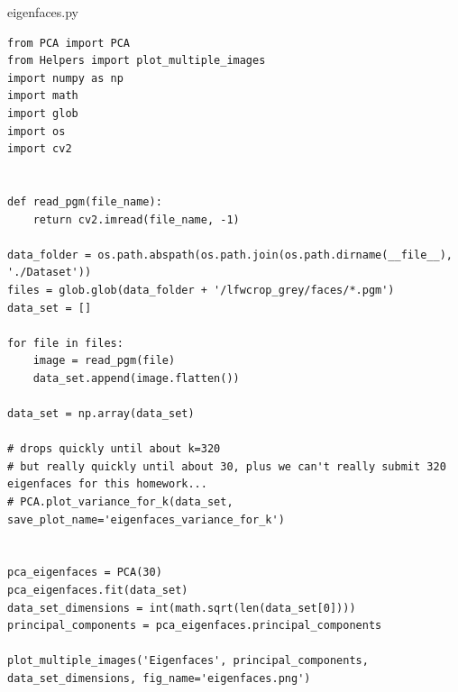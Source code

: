 eigenfaces.py
\begin{lstlisting}[style=py]
from PCA import PCA
from Helpers import plot_multiple_images
import numpy as np
import math
import glob
import os
import cv2


def read_pgm(file_name):
    return cv2.imread(file_name, -1)

data_folder = os.path.abspath(os.path.join(os.path.dirname(__file__), './Dataset'))
files = glob.glob(data_folder + '/lfwcrop_grey/faces/*.pgm')
data_set = []

for file in files:
    image = read_pgm(file)
    data_set.append(image.flatten())

data_set = np.array(data_set)

# drops quickly until about k=320
# but really quickly until about 30, plus we can't really submit 320 eigenfaces for this homework...
# PCA.plot_variance_for_k(data_set, save_plot_name='eigenfaces_variance_for_k')


pca_eigenfaces = PCA(30)
pca_eigenfaces.fit(data_set)
data_set_dimensions = int(math.sqrt(len(data_set[0])))
principal_components = pca_eigenfaces.principal_components

plot_multiple_images('Eigenfaces', principal_components, data_set_dimensions, fig_name='eigenfaces.png')

\end{lstlisting}



